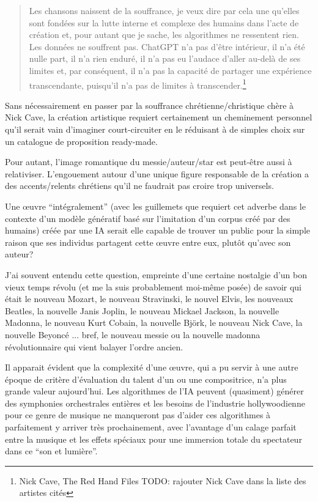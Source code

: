 \begin{quotation}
Les chansons naissent de la souffrance, je veux dire par cela une qu'elles sont fondées sur la lutte interne et complexe des humains dans l'acte de création et, pour autant que je sache, les algorithmes ne ressentent rien. Les données ne souffrent pas. ChatGPT n'a pas d'être intérieur, il n'a été nulle part, il n'a rien enduré, il n'a pas eu l'audace d'aller au-delà de ses limites et, par conséquent, il n'a pas la capacité de partager une expérience transcendante, puisqu'il n'a pas de limites à transcender.\footnote{Nick Cave, The Red Hand Files TODO: rajouter Nick Cave dans la liste des artistes cités}
\end{quotation}

Sans nécessairement en passer par la souffrance chrétienne/christique chère à Nick Cave, la création artistique requiert certainement un cheminement personnel qu'il serait vain d'imaginer court-circuiter en le réduisant à de simples choix sur un catalogue de proposition ready-made.

Pour autant, l'image romantique du messie/auteur/star est peut-être aussi à relativiser. L'engouement autour d'une unique figure responsable de la création a des accents/relents chrétiens qu'il ne faudrait pas croire trop universels.

Une œuvre ``intégralement'' (avec les guillemets que requiert cet adverbe dans le contexte d'un modèle génératif basé sur l'imitation d'un corpus créé par des humains) créée par une IA serait elle capable de trouver un public pour la simple raison que ses individus partagent cette œuvre entre eux, plutôt qu'avec son auteur?

J'ai souvent entendu cette question, empreinte d'une certaine nostalgie d'un bon vieux temps révolu (et me la suis probablement moi-même posée) de savoir qui était le nouveau Mozart, le nouveau Stravinski, le nouvel Elvis, les nouveaux Beatles, la nouvelle Janis Joplin, le nouveau Mickael Jackson, la nouvelle Madonna, le nouveau Kurt Cobain, la nouvelle Björk, le nouveau Nick Cave, la nouvelle Beyoncé ... bref, le nouveau messie ou la nouvelle madonna révolutionnaire qui vient balayer l'ordre ancien. 


Il apparait évident que la complexité d'une œuvre, qui a pu servir à une autre époque de critère d'évaluation du talent d'un ou une compositrice, n'a plus grande valeur aujourd'hui. Les algorithmes de l'IA peuvent (quasiment) générer des symphonies orchestrales entières et les besoins de l'industrie hollywoodienne pour ce genre de musique ne manqueront pas d'aider ces algorithmes à parfaitement y arriver très prochainement, avec l'avantage d'un calage parfait entre la musique et les effets spéciaux pour une immersion totale du spectateur dans ce ``son et lumière''.

